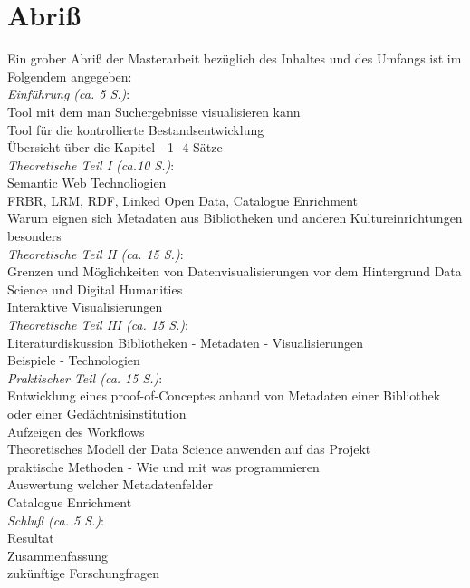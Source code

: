 \documentclass[10pt,a4paper,twocolumn,conference]{IEEEtran}
\begin{document}
\section{Abriß}
Ein grober Abriß der Masterarbeit bezüglich des Inhaltes und des Umfangs ist im
Folgendem angegeben:\\
\textit{Einführung (ca. 5 S.)}:\\Tool mit dem man Suchergebnisse visualisieren kann\\
Tool für die kontrollierte Bestandsentwicklung\\Übersicht über die Kapitel - 1-
4 Sätze\\
\textit{Theoretische Teil I (ca.10 S.)}:\\
Semantic Web Technoliogien\\
FRBR, LRM, RDF, Linked Open Data, Catalogue Enrichment\\
Warum eignen sich Metadaten aus Bibliotheken und anderen Kultureinrichtungen besonders\\
\textit{Theoretische Teil II (ca. 15 S.)}:\\
Grenzen und Möglichkeiten von Datenvisualisierungen vor dem
Hintergrund Data Science und Digital Humanities\\
Interaktive Visualisierungen\\ 
\textit{Theoretische Teil III (ca. 15 S.)}:\\
Literaturdiskussion Bibliotheken - Metadaten - Visualisierungen\\
Beispiele - Technologien\\
\textit{Praktischer Teil (ca. 15 S.)}:\\
Entwicklung eines proof-of-Conceptes anhand von Metadaten einer
Bibliothek oder einer Gedächtnisinstitution\\
Aufzeigen des Workflows\\
Theoretisches Modell der Data Science anwenden auf das Projekt\\
praktische Methoden - Wie und mit was programmieren\\
Auswertung welcher Metadatenfelder\\
Catalogue Enrichment\\
\textit{Schluß (ca. 5 S.)}:\\
Resultat\\
Zusammenfassung\\
zukünftige Forschungfragen
            

 
\end{document}
